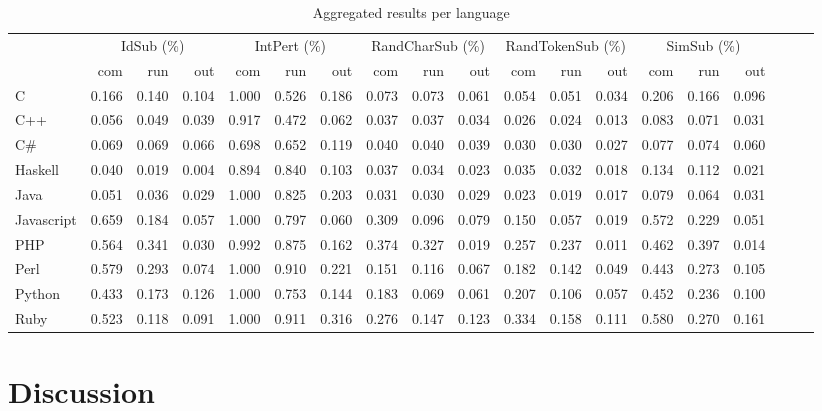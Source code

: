 \documentclass[10pt]{sigplanconf}
\begin{document}
\begin{table*}
\begin{center}
\begin{tabular}{ l r r r r r r r r r r r r r r r r r r }
 & \multicolumn{3}{c}{IdSub (\%)} & \multicolumn{3}{c}{IntPert (\%)} & \multicolumn{3}{c}{RandCharSub (\%)} & \multicolumn{3}{c}{RandTokenSub (\%)} & \multicolumn{3}{c}{SimSub (\%)}\\
 & com & run & out & com & run & out & com & run & out & com & run & out & com & run & out\\
\hline
C & 0.166 & 0.140 & 0.104  & 1.000 & 0.526 & 0.186  & 0.073 & 0.073 & 0.061  & 0.054 & 0.051 & 0.034  & 0.206 & 0.166 & 0.096 \\
C++ & 0.056 & 0.049 & 0.039  & 0.917 & 0.472 & 0.062  & 0.037 & 0.037 & 0.034  & 0.026 & 0.024 & 0.013  & 0.083 & 0.071 & 0.031 \\
C\# & 0.069 & 0.069 & 0.066  & 0.698 & 0.652 & 0.119  & 0.040 & 0.040 & 0.039  & 0.030 & 0.030 & 0.027  & 0.077 & 0.074 & 0.060 \\
Haskell & 0.040 & 0.019 & 0.004  & 0.894 & 0.840 & 0.103  & 0.037 & 0.034 & 0.023  & 0.035 & 0.032 & 0.018  & 0.134 & 0.112 & 0.021 \\
Java & 0.051 & 0.036 & 0.029  & 1.000 & 0.825 & 0.203  & 0.031 & 0.030 & 0.029  & 0.023 & 0.019 & 0.017  & 0.079 & 0.064 & 0.031 \\
Javascript & 0.659 & 0.184 & 0.057  & 1.000 & 0.797 & 0.060  & 0.309 & 0.096 & 0.079  & 0.150 & 0.057 & 0.019  & 0.572 & 0.229 & 0.051 \\
PHP & 0.564 & 0.341 & 0.030  & 0.992 & 0.875 & 0.162  & 0.374 & 0.327 & 0.019  & 0.257 & 0.237 & 0.011  & 0.462 & 0.397 & 0.014 \\
Perl & 0.579 & 0.293 & 0.074  & 1.000 & 0.910 & 0.221  & 0.151 & 0.116 & 0.067  & 0.182 & 0.142 & 0.049  & 0.443 & 0.273 & 0.105 \\
Python & 0.433 & 0.173 & 0.126  & 1.000 & 0.753 & 0.144  & 0.183 & 0.069 & 0.061  & 0.207 & 0.106 & 0.057  & 0.452 & 0.236 & 0.100 \\
Ruby & 0.523 & 0.118 & 0.091  & 1.000 & 0.911 & 0.316  & 0.276 & 0.147 & 0.123  & 0.334 & 0.158 & 0.111  & 0.580 & 0.270 & 0.161 \\
\end{tabular}
\end{center}
\caption{Aggregated results per language}
\label{tbl:aggregated-per-language}
\end{table*}

\section{Discussion} %
\label{sec:discussion}
\end{document}
